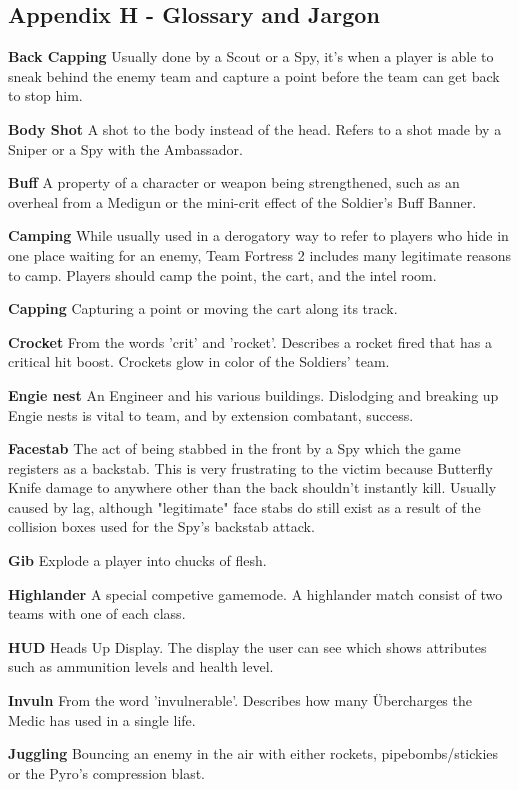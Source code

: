 \subsection{Appendix H - Glossary and Jargon}
\label{Glossary}

{\bf Back Capping} Usually done by a Scout or a Spy, it’s when a player is able to sneak behind the enemy team and capture a point before the team can get back to stop him.

{\bf Body Shot} A shot to the body instead of the head. Refers to a shot made by a Sniper or a Spy with the Ambassador. 

{\bf Buff} A property of a character or weapon being strengthened, such as an overheal from a Medigun or the mini-crit effect of the Soldier's Buff Banner.

{\bf Camping} While usually used in a derogatory way to refer to players who hide in one place waiting for an enemy, Team Fortress 2 includes many legitimate reasons to camp. Players should camp the point, the cart, and the intel room.

{\bf Capping} Capturing a point or moving the cart along its track.

{\bf Crocket} From the words 'crit' and 'rocket'. Describes a rocket fired that has a critical hit boost. Crockets glow in color of the Soldiers' team.

{\bf Engie nest} An Engineer and his various buildings. Dislodging and breaking up Engie nests is vital to team, and by extension combatant, success. 

{\bf Facestab} The act of being stabbed in the front by a Spy which the game registers as a backstab. This is very frustrating to the victim because Butterfly Knife damage to anywhere other than the back shouldn't instantly kill. Usually caused by lag, although "legitimate" face stabs do still exist as a result of the collision boxes used for the Spy's backstab attack. 

{\bf Gib} Explode a player into chucks of flesh.

{\bf Highlander} A special competive gamemode. A highlander match consist of two teams with one of each class.

{\bf HUD} Heads Up Display. The display the user can see which shows attributes such as ammunition levels and health level.

{\bf Invuln} From the word 'invulnerable'. Describes how many Übercharges the Medic has used in a single life.  

{\bf Juggling} Bouncing an enemy in the air with either rockets, pipebombs/stickies or the Pyro's compression blast.

